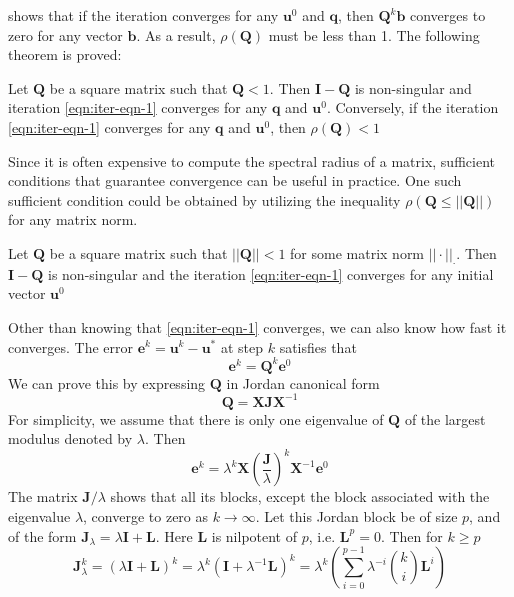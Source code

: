 shows that if the iteration converges for any $\boldsymbol{u}^0$ and $\boldsymbol{q}$, then $\boldsymbol{Q}^k\boldsymbol{b}$ converges to zero for any vector $\boldsymbol{b}$. As a result, $\rho(\boldsymbol{Q})$ must be less than 1. The following theorem is proved:
\begin{theorem}
Let $\boldsymbol{Q}$ be a square matrix such that $\boldsymbol{Q} < 1$. Then $\boldsymbol{I} - \boldsymbol{Q}$ is non-singular and iteration \autoref{eqn:iter-eqn-1} converges for any $
\boldsymbol{q}$ and $\boldsymbol{u}^0$. Conversely, if the iteration \autoref{eqn:iter-eqn-1} converges for any $\boldsymbol{q}$ and $\boldsymbol{u}^0$, then $\rho(\boldsymbol{Q}) < 1$
\end{theorem}
Since it is often expensive to compute the spectral radius of a matrix, sufficient conditions that guarantee convergence can be useful in practice. One such sufficient condition could be obtained by utilizing the inequality $\rho(\boldsymbol{Q} \leq ||\boldsymbol{Q}||)$ for any matrix norm.
\begin{corollary}
Let $\boldsymbol{Q}$ be a square matrix such that $||\boldsymbol{Q}|| < 1$  for some matrix norm $||\cdot||_\cdot$. Then $\boldsymbol{I} - \boldsymbol{Q}$ is non-singular and the iteration \autoref{eqn:iter-eqn-1} converges for any initial vector $\boldsymbol{u}^0$
\end{corollary}

Other than knowing that \autoref{eqn:iter-eqn-1} converges, we can also know how fast it converges. The error $\boldsymbol{e}^k = \boldsymbol{u}^k - \boldsymbol{u}^*$ at step $k$ satisfies that 
\begin{equation}
    \boldsymbol{e}^k = \boldsymbol{Q}^k \boldsymbol{e}^0
\end{equation}
We can prove this by expressing $\boldsymbol{Q}$ in Jordan canonical form
\begin{equation}
    \boldsymbol{Q} = \boldsymbol{X}\boldsymbol{J}\boldsymbol{X}^{-1}
\end{equation}
For simplicity, we assume that there is only one eigenvalue of $\boldsymbol{Q}$ of the largest modulus denoted by $\lambda$. Then
\begin{equation}
    \boldsymbol{e}^k = \lambda^k\boldsymbol{X}(\frac{\boldsymbol{J}}{\lambda})^k\boldsymbol{X}^{-1}\boldsymbol{e}^0    
\end{equation}
The matrix $\boldsymbol{J}/\lambda$ shows that all its blocks, except the block associated with the eigenvalue $\lambda$, converge to zero as $k \to \infty$. Let this Jordan block be of size $p$, and of the form $\boldsymbol{J}_\lambda = \lambda \boldsymbol{I} + \boldsymbol{L}$. Here $\boldsymbol{L}$ is nilpotent of $p$, i.e. $\boldsymbol{L}^p = 0$. Then for $k \geq p$
\begin{equation}
    \boldsymbol{J}_\lambda^k =  (\lambda \boldsymbol{I} + \boldsymbol{L})^k = \lambda^k(\boldsymbol{I} + \lambda^{-1}\boldsymbol{L})^{k} = \lambda^k(\sum_{i=0}^{p-1}{\lambda^{-i}{k \choose i}\boldsymbol{L}^i})
\end{equation}

